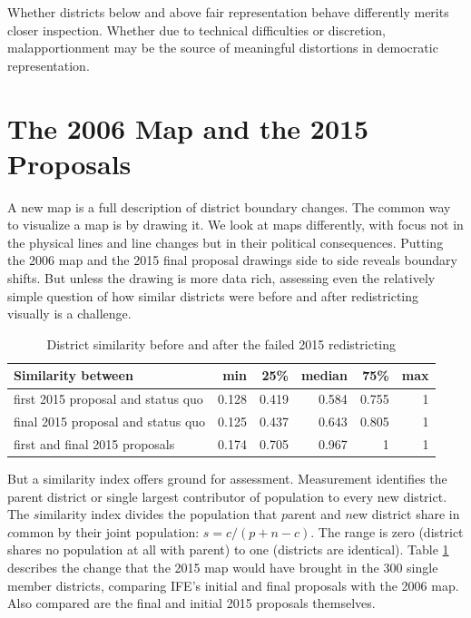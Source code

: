 \documentclass[letter,12pt]{article}
\begin{document}
Whether districts below and above fair representation behave differently merits closer inspection. Whether due to technical difficulties or discretion, malapportionment may be the source of meaningful distortions in democratic representation.

\section{The 2006 Map and the 2015 Proposals}


A new map is a full description of district boundary changes. The common way to visualize a map is by drawing it. We look at maps differently, with focus not in the physical lines and line changes but in their political consequences. Putting the 2006 map and the 2015 final proposal drawings side to side reveals boundary shifts. But unless the drawing is more data rich, assessing even the relatively simple question of how similar districts were before and after redistricting visually is a challenge. 

\begin{table}
\begin{center}
  \begin{tabular}{lrrrrr}
  Similarity between                 &   min  &  25\%  & median &  75\% &  max \\ \hline
  first 2015 proposal and status quo & 0.128  & 0.419  & 0.584  & 0.755 &  1   \\
  final 2015 proposal and status quo & 0.125  & 0.437  & 0.643  & 0.805 &  1   \\
  first and final 2015 proposals     & 0.174  & 0.705  & 0.967  & 1     &  1   \\
  \end{tabular}
  \caption{District similarity before and after the failed 2015 redistricting}\label{T:simIndex}
\end{center}
\end{table}

But a similarity index \citep[][:15--7]{cox.katz.2002} offers ground for assessment. Measurement identifies the parent district or single largest contributor of population to every new district. The $s$imilarity index divides the population that $p$arent and $n$ew district share in $c$ommon by their joint population: $s = c / (p + n - c)$. The range is zero (district shares no population at all with parent) to one (districts are identical). Table \ref{T:simIndex} describes the change that the 2015 map would have brought in the 300 single member districts, comparing IFE's initial and final proposals with the 2006 map. Also compared are the final and initial 2015 proposals themselves. 
\end{document}
